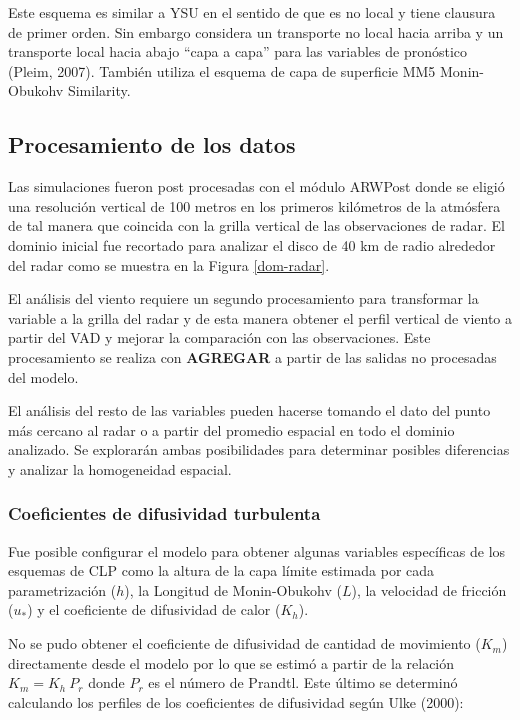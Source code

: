 \documentclass[12pt,spanish,oneside]{book}
\begin{document}
Este esquema es similar a YSU en el sentido de que es no local y tiene
clausura de primer orden. Sin embargo considera un transporte no local
hacia arriba y un transporte local hacia abajo ``capa a capa'' para las
variables de pronóstico (Pleim, 2007). También utiliza el esquema de
capa de superficie MM5 Monin-Obukohv Similarity.

\subsection{Procesamiento de los
datos}\label{procesamiento-de-los-datos}

Las simulaciones fueron post procesadas con el módulo ARWPost donde se
eligió una resolución vertical de 100 metros en los primeros kilómetros
de la atmósfera de tal manera que coincida con la grilla vertical de las
observaciones de radar. El dominio inicial fue recortado para analizar
el disco de 40 km de radio alrededor del radar como se muestra en la
Figura \ref{dom-radar}.

El análisis del viento requiere un segundo procesamiento para
transformar la variable a la grilla del radar y de esta manera obtener
el perfil vertical de viento a partir del VAD y mejorar la comparación
con las observaciones. Este procesamiento se realiza con
\textbf{AGREGAR} a partir de las salidas no procesadas del modelo.

El análisis del resto de las variables pueden hacerse tomando el dato
del punto más cercano al radar o a partir del promedio espacial en todo
el dominio analizado. Se explorarán ambas posibilidades para determinar
posibles diferencias y analizar la homogeneidad espacial.

\subsubsection{Coeficientes de difusividad
turbulenta}\label{coeficientes-de-difusividad-turbulenta}

Fue posible configurar el modelo para obtener algunas variables
específicas de los esquemas de CLP como la altura de la capa límite
estimada por cada parametrización (\(h\)), la Longitud de Monin-Obukohv
(\(L\)), la velocidad de fricción (\(u_*\)) y el coeficiente de
difusividad de calor (\(K_h\)).

No se pudo obtener el coeficiente de difusividad de cantidad de
movimiento (\(K_m\)) directamente desde el modelo por lo que se estimó a
partir de la relación \(K_m = K_h \: P_r\) donde \(P_r\) es el número de
Prandtl. Este último se determinó calculando los perfiles de los
coeficientes de difusividad según Ulke (2000):
\end{document}
